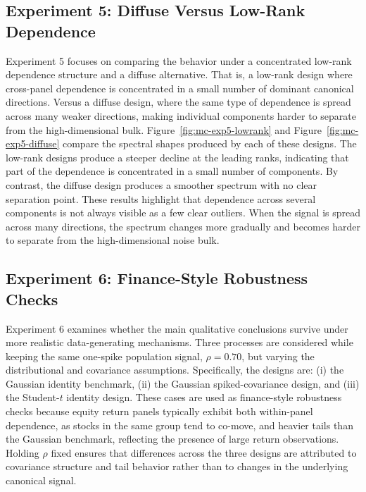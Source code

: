 \documentclass[12pt]{report} %
\begin{document}
\subsection*{Experiment 5: Diffuse Versus Low-Rank Dependence}

Experiment 5 focuses on comparing the behavior under a concentrated low-rank dependence structure 
and a diffuse alternative. That is, a low-rank design where cross-panel dependence 
is concentrated in a small number of dominant canonical directions. Versus a diffuse design, 
where the same type of dependence is spread across many weaker directions, making individual 
components harder to separate from the high-dimensional bulk. Figure~\ref{fig:mc-exp5-lowrank} and 
Figure~\ref{fig:mc-exp5-diffuse} compare the spectral shapes produced by each of these designs.
The low-rank designs produce a steeper decline at the leading ranks, indicating that part of 
the dependence is concentrated in a small number of components. By contrast, the diffuse design 
produces a smoother spectrum with no clear separation point. These results highlight that dependence 
across several components is not always visible as a few clear outliers. When the signal is spread 
across many directions, the spectrum changes more gradually and becomes harder to separate from 
the high-dimensional noise bulk.

\subsection*{Experiment 6: Finance-Style Robustness Checks}

Experiment 6 examines whether the main qualitative conclusions survive under more realistic 
data-generating mechanisms. Three  processes are considered while keeping the same 
one-spike population signal, \(\rho=0.70\), but varying the distributional and covariance assumptions. 
Specifically, the designs are: (i) the Gaussian identity benchmark, (ii) the Gaussian 
spiked-covariance design, and (iii) the Student-\(t\) identity design. 
These cases are used as finance-style robustness checks because equity return panels typically 
exhibit both within-panel dependence, as stocks in the same group tend to co-move, and heavier 
tails than the Gaussian benchmark, reflecting the presence of large return observations. 
Holding \(\rho\) fixed ensures that differences across the three designs are attributed to 
covariance structure and tail behavior rather than to changes in the underlying canonical signal.
\end{document}
